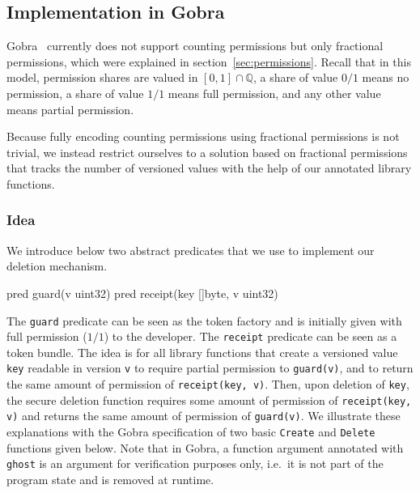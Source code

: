 \subsection{Implementation in Gobra}
\label{sec:implementation-in-gobra}

Gobra~\cite{wolf2021gobra} currently does not support counting permissions but only fractional permissions, which were explained in section~\ref{sec:permissions}.
Recall that in this model, permission shares are valued in $[0,1]\cap\mathbb{Q}$, a share of value $0/1$ means no permission, a share of value $1/1$ means full permission, and any other value means partial permission.

Because fully encoding counting permissions using fractional permissions is not trivial, we instead restrict ourselves to a solution based on fractional permissions that tracks the number of versioned values with the help of our annotated library functions.

\subsubsection{Idea}
\label{sec:counting-permissions-idea}

We introduce below two abstract predicates that we use to implement our deletion mechanism.

\begin{gobra}
pred guard(v uint32)
pred receipt(key []byte, v uint32)
\end{gobra}

The \texttt{guard} predicate can be seen as the token factory and is initially given with full permission ($1/1$) to the developer.
The \texttt{receipt} predicate can be seen as a token bundle.
The idea is for all library functions that create a versioned value \texttt{key} readable in version \texttt{v} to require partial permission to \texttt{guard(v)}, and to return the same amount of permission of \texttt{receipt(key, v)}.
Then, upon deletion of \texttt{key}, the secure deletion function requires some amount of permission of \texttt{receipt(key, v)} and returns the same amount of permission of \texttt{guard(v)}.
We illustrate these explanations with the Gobra specification of two basic \texttt{Create} and \texttt{Delete} functions given below.
Note that in Gobra, a function argument annotated with \texttt{ghost} is an argument for verification purposes only, i.e.\ it is not part of the program state and is removed at runtime.

